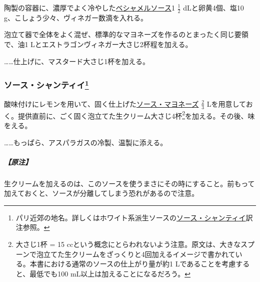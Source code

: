 \begin{recette}


陶製の容器に、濃厚でよく冷やした\protect\hyperlink{sauce-bechamel}{ベシャメルソース}1
\(\frac{1}{2}\) dLと卵黄4個、塩10
g、こしょう少々、ヴィネガー数滴を入れる。

泡立て器で全体をよく混ぜ、標準的なマヨネーズを作るのとまったく同じ要領で、油1
Lとエストラゴンヴィネガー大さじ2杯程を加える。

\ldots{}\ldots{}仕上げに、マスタード大さじ1杯を加える。

\atoaki{}

\hypertarget{sauce-chantilly-froide}{%
\subsubsection[ソース・シャンティイ]{\texorpdfstring{ソース・シャンティイ\footnote{パリ近郊の地名。詳しくはホワイト系派生ソースの\protect\hyperlink{sauce-chantilly}{ソース・シャンティイ}訳注参照。}}{ソース・シャンティイ}}\label{sauce-chantilly-froide}}



酸味付けにレモンを用いて、固く仕上げた\protect\hyperlink{mayonnaise}{ソース・マヨネーズ}
\(\frac{2}{3}\)
Lを用意しておく。提供直前に、ごく固く泡立てた生クリーム大さじ4杯\footnote{大さじ1杯
  = 15
  ccという概念にとらわれないよう注意。原文は、大きなスプーンで泡立てた生クリームをざっくりと4回加えるイメージで書かれている。本書における通常のソースの仕上がり量が約1
  Lであることを考慮すると、最低でも100 mL以上は加えることになるだろう。}を加える。その後、味をえる。

\ldots{}\ldots{}もっぱら、アスパラガスの冷製、温製に添える。

\hypertarget{nota-sauce-chantilly-froide}{%
\subparagraph{【原注】}\label{nota-sauce-chantilly-froide}}

生クリームを加えるのは、このソースを使うまさにその時にすること。前もって加えておくと、ソースが分離してしまう恐れがあるので注意。


\end{recette}
